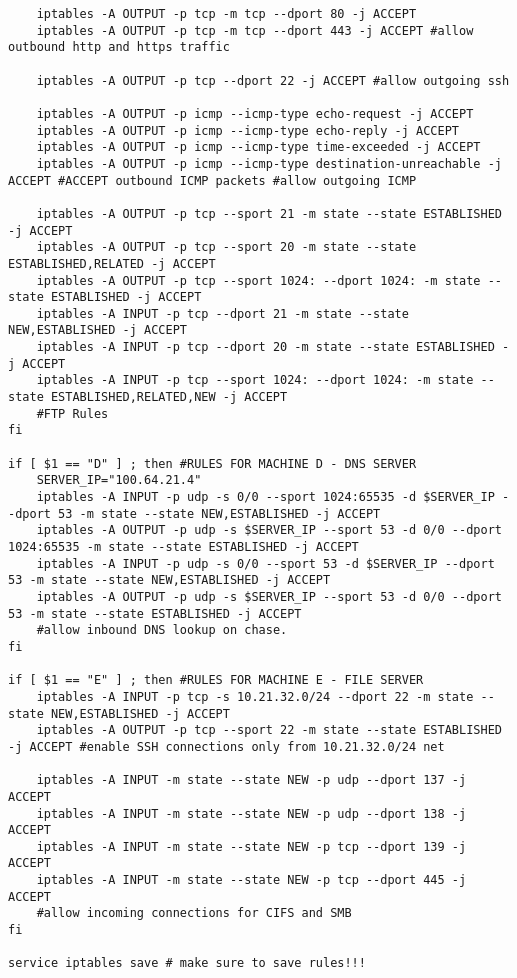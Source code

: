 \documentclass[11pt,onside]{article}
\begin{document}
\begin{lstlisting}
	iptables -A OUTPUT -p tcp -m tcp --dport 80 -j ACCEPT
	iptables -A OUTPUT -p tcp -m tcp --dport 443 -j ACCEPT #allow outbound http and https traffic
	
	iptables -A OUTPUT -p tcp --dport 22 -j ACCEPT #allow outgoing ssh
	
	iptables -A OUTPUT -p icmp --icmp-type echo-request -j ACCEPT
	iptables -A OUTPUT -p icmp --icmp-type echo-reply -j ACCEPT
	iptables -A OUTPUT -p icmp --icmp-type time-exceeded -j ACCEPT
	iptables -A OUTPUT -p icmp --icmp-type destination-unreachable -j ACCEPT #ACCEPT outbound ICMP packets #allow outgoing ICMP
	
	iptables -A OUTPUT -p tcp --sport 21 -m state --state ESTABLISHED -j ACCEPT
	iptables -A OUTPUT -p tcp --sport 20 -m state --state ESTABLISHED,RELATED -j ACCEPT
	iptables -A OUTPUT -p tcp --sport 1024: --dport 1024: -m state --state ESTABLISHED -j ACCEPT
	iptables -A INPUT -p tcp --dport 21 -m state --state NEW,ESTABLISHED -j ACCEPT
	iptables -A INPUT -p tcp --dport 20 -m state --state ESTABLISHED -j ACCEPT
	iptables -A INPUT -p tcp --sport 1024: --dport 1024: -m state --state ESTABLISHED,RELATED,NEW -j ACCEPT
	#FTP Rules
fi

if [ $1 == "D" ] ; then #RULES FOR MACHINE D - DNS SERVER
	SERVER_IP="100.64.21.4"
	iptables -A INPUT -p udp -s 0/0 --sport 1024:65535 -d $SERVER_IP --dport 53 -m state --state NEW,ESTABLISHED -j ACCEPT
	iptables -A OUTPUT -p udp -s $SERVER_IP --sport 53 -d 0/0 --dport 1024:65535 -m state --state ESTABLISHED -j ACCEPT
	iptables -A INPUT -p udp -s 0/0 --sport 53 -d $SERVER_IP --dport 53 -m state --state NEW,ESTABLISHED -j ACCEPT
	iptables -A OUTPUT -p udp -s $SERVER_IP --sport 53 -d 0/0 --dport 53 -m state --state ESTABLISHED -j ACCEPT 
	#allow inbound DNS lookup on chase.
fi

if [ $1 == "E" ] ; then #RULES FOR MACHINE E - FILE SERVER
	iptables -A INPUT -p tcp -s 10.21.32.0/24 --dport 22 -m state --state NEW,ESTABLISHED -j ACCEPT
	iptables -A OUTPUT -p tcp --sport 22 -m state --state ESTABLISHED -j ACCEPT #enable SSH connections only from 10.21.32.0/24 net
	
	iptables -A INPUT -m state --state NEW -p udp --dport 137 -j ACCEPT
	iptables -A INPUT -m state --state NEW -p udp --dport 138 -j ACCEPT
	iptables -A INPUT -m state --state NEW -p tcp --dport 139 -j ACCEPT
	iptables -A INPUT -m state --state NEW -p tcp --dport 445 -j ACCEPT
	#allow incoming connections for CIFS and SMB
fi

service iptables save # make sure to save rules!!! 
\end{lstlisting}
\end{document}

